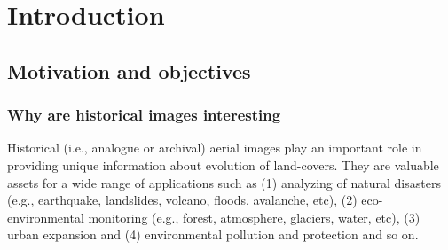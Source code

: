 
\chapter{Introduction}
\label{chap:intro}
\minitoc

\section{Motivation and objectives}
\subsection{Why are historical images interesting}
Historical (i.e., analogue or archival) aerial images play an important role in providing unique information about evolution of land-covers. 
They are valuable assets for a wide range of applications such as (1) analyzing of natural disasters (e.g., earthquake, landslides, volcano, floods, avalanche, etc), (2) eco-environmental monitoring (e.g., forest, atmosphere, glaciers, water, etc), (3) urban expansion and (4) environmental pollution and protection and so on.


